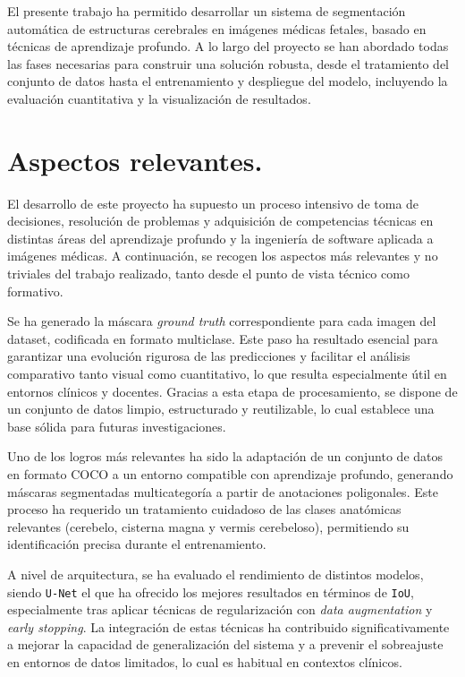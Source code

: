 
El presente trabajo ha permitido desarrollar un sistema de segmentación automática de estructuras cerebrales en imágenes médicas fetales, basado en técnicas de aprendizaje profundo. A lo largo del proyecto se han abordado todas las fases necesarias para construir una solución robusta, desde el tratamiento del conjunto de datos hasta el entrenamiento y despliegue del modelo, incluyendo la evaluación cuantitativa y la visualización de resultados.

\section{Aspectos relevantes.}

El desarrollo de este proyecto ha supuesto un proceso intensivo de toma de decisiones, resolución de problemas y adquisición de competencias técnicas en distintas áreas del aprendizaje profundo y la ingeniería de software aplicada a imágenes médicas. A continuación, se recogen los aspectos más relevantes y no triviales del trabajo realizado, tanto desde el punto de vista técnico como formativo.

Se ha generado la máscara \textit{ground truth} correspondiente para cada imagen del dataset, codificada en formato multiclase. Este paso ha resultado esencial para garantizar una evolución rigurosa de las predicciones y facilitar el análisis comparativo tanto visual como cuantitativo, lo que resulta especialmente útil en entornos clínicos y docentes. Gracias a esta etapa de procesamiento, se dispone de un conjunto de datos limpio, estructurado y reutilizable, lo cual establece una base sólida para futuras investigaciones.

Uno de los logros más relevantes ha sido la adaptación de un conjunto de datos en formato COCO a un entorno compatible con aprendizaje profundo, generando máscaras segmentadas multicategoría a partir de anotaciones poligonales. Este proceso ha requerido un tratamiento cuidadoso de las clases anatómicas relevantes (cerebelo, cisterna magna y vermis cerebeloso), permitiendo su identificación precisa durante el entrenamiento.

A nivel de arquitectura, se ha evaluado el rendimiento de distintos modelos, siendo \texttt{U-Net} el que ha ofrecido los mejores resultados en términos de \texttt{IoU}, especialmente tras aplicar técnicas de regularización con \textit{data augmentation} y \textit{early stopping}. La integración de estas técnicas ha contribuido significativamente a mejorar la capacidad de generalización del sistema y a prevenir el sobreajuste en entornos de datos limitados, lo cual es habitual en contextos clínicos.

